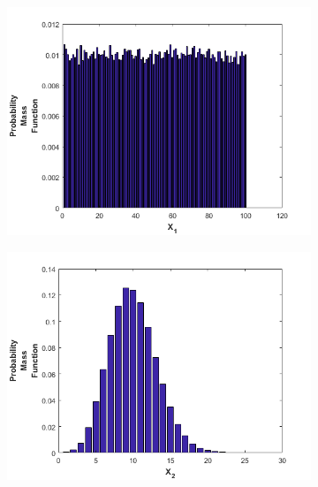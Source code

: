\documentclass[11pt]{article}
\theoremstyle{definition}
\theoremstyle{lemma}
\theoremstyle{remark}
\begin{document}
	\begin{figure}[h!]
		\centering
		\begin{subfigure}[h!]{0.48\textwidth}
			\includegraphics[width=\textwidth]{./Images/6/1.png}
			\caption{  }
		\end{subfigure}
		\quad
		\begin{subfigure}[h!]{0.48\textwidth}
			\includegraphics[width=\textwidth]{./Images/6/2.png}
			\caption{  }
		\end{subfigure}
		

\end{figure}
\end{document}
